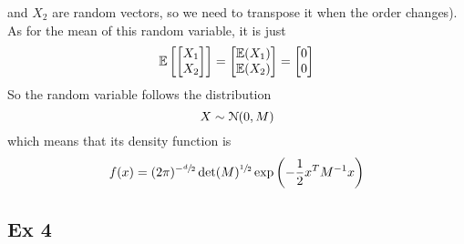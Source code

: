 \documentclass[12pt]{article}
\begin{document}
\begin{enumerate}[label=\alph*)]
        and $X_2$ are random vectors,
        so we need to transpose it when the order
        changes). \\
        As for the mean of this random variable,
        it is just 
        \[ \mathbb{E}\left[  \begin{bmatrix} {X_1} \\ {X_2} \end{bmatrix} \right]
        = \begin{bmatrix} {\mathbb{E}(X_1)} \\ {\mathbb{E}(X_2)} \end{bmatrix}
        = \begin{bmatrix} {0} \\ {0} \end{bmatrix} \]
        So the random variable follows the
        distribution
        \[ X \sim \mathcal{N}(0, M) \]
        which means that its density function is
        \[ f(x) = (2\pi)^{-\sfrac{d}{2}}
        \det(M)^{\sfrac{1}{2}}
        \exp\left( -\dfrac{1}{2}x^T
        M^{-1} x \right) \]
    \end{enumerate}

    \newpage

    \subsection*{Ex 4}
\end{document}
